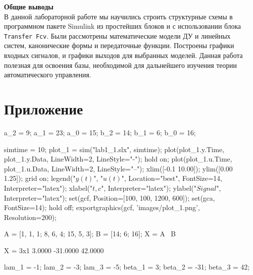 \textbf{Общие выводы}\\
В данной лабораторной работе мы научились строить структурные
схемы в программном пакете Simulink из простейших блоков и
с использовании блока \texttt{Transfer Fcv}. Были рассмотрены
математические модели ДУ и линейных систем, канонические
формы и передаточные функции. Построены графики входных
сигналов, и графики выходов для выбранных моделей. Данная работа
полезная для освоения базы, необходимой для дальнейшего
изучения теории автоматического управления.

\newpage
\section{Приложение}

\label{app:coeffs}

\vspace{1em}
\begin{matlabcode}
a_2 = 9;
a_1 = 23;
a_0 = 15;
b_2 = 14;
b_1 = 6;
b_0 = 16;
\end{matlabcode}

\begin{matlabcode}
simtime = 10;
plot_1 = sim("lab1_1.slx", simtime);
plot(plot_1.y.Time, plot_1.y.Data, LineWidth=2, LineStyle="-");
hold on;
plot(plot_1.u.Time, plot_1.u.Data, LineWidth=2, LineStyle="--");
xlim([-0.1 10.00]);
ylim([0.00 1.25]);
grid on;
legend("$y(t)$", "$u(t)$", Location="best", FontSize=14,
 Interpreter="latex");
xlabel("$t, c$", Interpreter="latex");
ylabel("$Signal$", Interpreter="latex");
set(gcf, Position=[100, 100, 1200, 600]);
set(gca, FontSize=14); 
hold off;
exportgraphics(gcf, 'images/plot_1.png', Resolution=200);
\end{matlabcode}


\begin{matlabcode}
A = [1, 1, 1;
     8, 6, 4;
     15, 5, 3];
B = [14; 6; 16];
X = A \ B
\end{matlabcode}
\begin{matlaboutput}
X = 3x1    
    3.0000
  -31.0000
   42.0000

\end{matlaboutput}

\begin{matlabcode}
lam_1 = -1;
lam_2 = -3;
lam_3 = -5;
beta_1 = 3;
beta_2 = -31;
beta_3 = 42;
\end{matlabcode}

